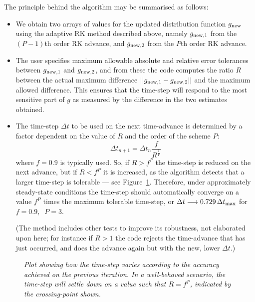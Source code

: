 \documentclass[10pt,a4paper]{article}
\begin{document}
The principle behind the algorithm may be summarised as follows:
\begin{itemize}

\item We obtain two arrays of values for the updated distribution function
  $g_{\mbox{\scriptsize new}}$ using the adaptive RK method described above,
  namely $g_{\mbox{\scriptsize new},1}$ from the $(P-1)$th order RK advance,
  and $g_{\mbox{\scriptsize new},2}$ from the $P$th order RK advance.

\item The user specifies maximum allowable absolute and relative error
  tolerances between $g_{\mbox{\scriptsize new},1}$ and $g_{\mbox{\scriptsize
      new},2}$, and from these the code computes the ratio $R$ between the
  actual maximum difference $|| g_{\mbox{\scriptsize new},1} -
  g_{\mbox{\scriptsize new},2}||$ and the maximum allowed difference. This
  ensures that the time-step will respond to the most sensitive part of $g$ as
  measured by the difference in the two estimates obtained.

\item The time-step $\Delta t$ to be used on the next time-advance is
  determined by a factor dependent on the value of $R$ and the order of the
  scheme $P$:
\[
\Delta t_{n+1} = \Delta t_n \frac{f}{R^{\frac{1}{P}}}
\]
where $f = 0.9$ is typically used. So, if $R > f^P$ the time-step is reduced
on the next advance, but if $R < f^P$ it is increased, as the algorithm
detects that a larger time-step is tolerable --- see
Figure~\ref{fig:adaptivedt1}. Therefore, under approximately steady-state
conditions the time-step should automatically converge on a value $f^P$ times
the maximum tolerable time-step, or $\Delta t \longrightarrow 0.729\,\Delta
t_{\mbox{\scriptsize max}}$ for $f=0.9, \;\; P=3$.

(The method includes other tests to improve its robustness, not elaborated
upon here; for instance if $R > 1$ the code rejects the time-advance that has
just occurred, and does the advance again but with the new, lower $\Delta t$.)

\end{itemize}

\begin{figure}[ht]
  \begin{center}
  \end{center}
  \caption{\textit{Plot showing how the time-step varies according to the
      accuracy achieved on the previous iteration. In a well-behaved scenario,
      the time-step will settle down on a value such that $R=f^P$, indicated
      by the crossing-point shown.}
    \label{fig:adaptivedt1} }
\end{figure}
\end{document}
